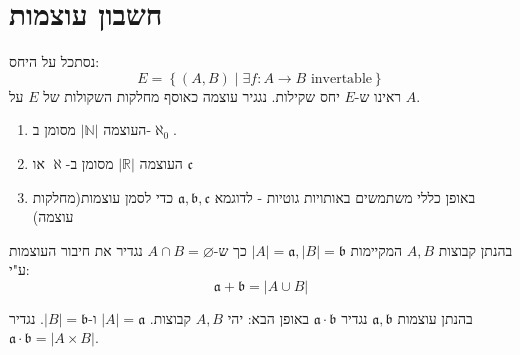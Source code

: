 \documentclass{tstextbook}
\begin{document}
\section{חשבון עוצמות}

\begin{definition}
נסתכל על היחס:
$$E=\left\{  (A,B)\mid \exists f:A\to B \text{ invertable}  \right\}$$
ראינו ש-\(E\) יחס שקילות. נגגיר עוצמה כאוסף מחלקות השקולות של \(E\) על \(A\).

\end{definition}
\begin{symbolize}
  \begin{enumerate}
    \item העוצמה \(|\mathbb{N}|\) מסומן ב-\(\aleph_{0}\). 


    \item העוצמה \(|\mathbb{R}|\) מסומן ב-\(\aleph\) או \(\mathfrak{c}\)


    \item באופן כללי משתמשים באותויות גוטיות - לדוגמא \(\mathfrak{a,b,c}\) כדי לסמן עוצמות(מחלקות עוצמה) 


  \end{enumerate}
\end{symbolize}
\begin{definition}
בהנתן קבוצות \(A,B\) המקיימות \(|A|=\mathfrak{a},|B|=\mathfrak{b}\) כך ש-\(A\cap B = \varnothing\) נגדיר את חיבור העוצמות ע"י:
$${\mathfrak{a}}+{\mathfrak{b}}=|A\cup B|$$

\end{definition}
\begin{definition}
בהנתן עוצמות \(\mathfrak{a,b}\) נגדיר \(\mathfrak{a\cdot b}\) באופן הבא:
יהי \(A,B\) קבוצות. \(|A|=\mathfrak{a}\) ו-\(|B|=\mathfrak{b}\). נגדיר \(\mathfrak{a\cdot b}=|A\times B|\).

\end{definition}
\end{document}
